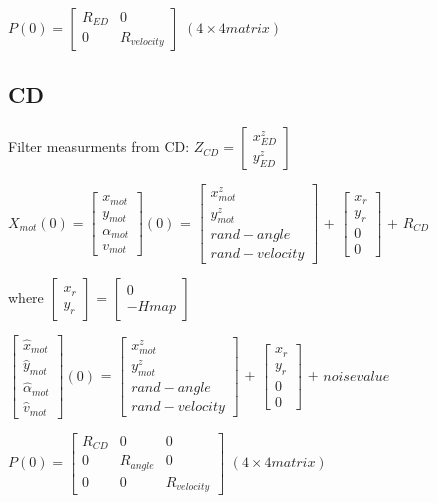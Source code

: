 \documentclass[11pt,a4paper]{article}
\begin{document}
$P(0) = \begin{bmatrix}
R_{ED} & 0 \\
0 & R_{velocity}
\end{bmatrix}$ $(4\times 4 matrix)$

\subsection{CD}
\noindent Filter measurments from CD: $Z_{CD} = \begin{bmatrix} x_{ED}^{z} \\ y_{ED}^{z} \end{bmatrix}$  


$ X_{mot}(0) = \begin{bmatrix} x_{mot} \\ y_{mot} \\ \alpha_{mot} \\ v_{mot} \end{bmatrix}(0)$ = $\begin{bmatrix} x_{mot}^{z} \\ y_{mot}^{z} \\ rand-angle \\ rand-velocity \end{bmatrix}$ + $\begin{bmatrix} x_{r} \\ y_{r} \\ 0 \\ 0 \end{bmatrix}$   + $R_{CD}$

\noindent where $\begin{bmatrix} x_{r} \\ y_{r} \end{bmatrix}$ = $\begin{bmatrix} 0 \\ -Hmap \end{bmatrix}$

$ \begin{bmatrix} \hat{x}_{mot} \\ \hat{y}_{mot} \\ \hat{\alpha}_{mot} \\ \hat{v}_{mot} \end{bmatrix}(0)$ = $\begin{bmatrix} x_{mot}^{z} \\ y_{mot}^{z} \\ rand-angle \\ rand-velocity \end{bmatrix}$ + $\begin{bmatrix} x_{r} \\ y_{r} \\ 0 \\ 0 \end{bmatrix}$   + $noisevalue$

$P(0) = \begin{bmatrix}
R_{CD} & 0 & 0 \\
0  & R_{angle} & 0 \\
0 & 0 & R_{velocity}
\end{bmatrix}$ $(4\times 4 matrix)$
\end{document}
